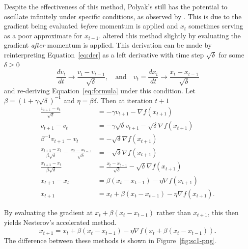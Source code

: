 \documentclass{article}
\newcommand{\dv}[2]{\frac{d #1}{d #2}}
\theoremstyle{definition}
\begin{document}
Despite the effectiveness of this method, Polyak's still has the potential to
oscillate infinitely under specific conditions, as observed by
\citeauthor{lessard2016analysis}. This is due to the gradient being evaluated
\emph{before} momentum is applied and $x_t$ sometimes serving as a poor approximate
for $x_{t - 1}$. \citeauthor{nesterov1983method} altered this method slightly by
evaluating the gradient \emph{after} momentum is applied.  This derivation can
be made by reinterpreting Equation~\ref{eq:der} as a left derivative with time
step $\sqrt\delta$ for some $\delta \geq 0$
\begin{equation}
    \label{eq:der}
    \dv{v_t}{t} \rightarrow \frac{v_{t} - v_{t - 1}}{\sqrt{\delta}}, \quad \text{and}
    \quad v_{t} = \dv{x_t}{t} \rightarrow \frac{x_{t} - x_{t - 1}}{\sqrt{\delta}}
\end{equation}
and re-deriving Equation~\ref{eq:formula} under this condition. Let $\beta =
{\left( 1 + \gamma \sqrt{\delta} \right) }^{-1}$ and $\eta = \beta \delta$. Then
at iteration $t + 1$
\begin{equation}
    \label{eq:formula}
    \begin{aligned}
        \frac{v_{t + 1} - v_{t}}{\sqrt{\delta}} &= -\gamma v_{t + 1} -\nabla
        f(x_{t + 1}) \\
        v_{t + 1} - v_{t} &= -\gamma \sqrt{\delta}v_{t + 1} -\sqrt{\delta}\nabla
        f(x_{t + 1}) \\
        \beta^{-1}v_{t + 1} - v_{t} &= -\sqrt{\delta}\nabla
        f(x_{t + 1}) \\
        \frac{x_{t + 1} - x_{t}}{\beta\sqrt{\delta}} - \frac{x_{t} - x_{t - 1}}{\sqrt{\delta}} &=  -\sqrt{\delta}\nabla
        f(x_{t + 1}) \\
        \frac{x_{t + 1} - x_{t}}{\beta\sqrt{\delta}} &= \frac{x_{t} - x_{t -
        1}}{\sqrt{\delta}} - \sqrt{\delta}\nabla f(x_{t + 1}) \\
        x_{t + 1} - x_{t} &= \beta (x_{t} - x_{t -
        1}) - \eta \nabla f(x_{t + 1}) \\
        x_{t + 1} &= x_{t} + \beta (x_{t} - x_{t -
        1}) - \eta \nabla f(x_{t + 1}).
    \end{aligned}
\end{equation}

By evaluating the gradient at $x_t + \beta(x_t - x_{t - 1})$ rather than $x_{t +
1}$, this then yields Nesterov's accelerated method.
\begin{equation}
    x_{t + 1} = x_t + \beta (x_t - x_{t - 1}) - \eta \nabla f(x_t + \beta (x_t - x_{t -
    1})).
\end{equation}
The difference between these methods is shown in
Figure~\ref{fig:sc1-png}.
\end{document}
